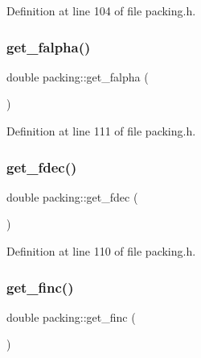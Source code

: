 Definition at line 104 of file packing.\+h.

\mbox{\label{classpacking_a0c8cad7afd9da1c30856b1201be15535}} 
\subsubsection{\texorpdfstring{get\+\_\+falpha()}{get\_falpha()}}
{\footnotesize\ttfamily double packing\+::get\+\_\+falpha (\begin{DoxyParamCaption}{ }\end{DoxyParamCaption})\hspace{0.3cm}{\ttfamily [inline]}}



Definition at line 111 of file packing.\+h.

\mbox{\label{classpacking_a2b4e47ab0671d9ee9892495df465be17}} 
\subsubsection{\texorpdfstring{get\+\_\+fdec()}{get\_fdec()}}
{\footnotesize\ttfamily double packing\+::get\+\_\+fdec (\begin{DoxyParamCaption}{ }\end{DoxyParamCaption})\hspace{0.3cm}{\ttfamily [inline]}}



Definition at line 110 of file packing.\+h.

\mbox{\label{classpacking_a58b555de4a9902399b3ab82dabfefd12}} 
\subsubsection{\texorpdfstring{get\+\_\+finc()}{get\_finc()}}
{\footnotesize\ttfamily double packing\+::get\+\_\+finc (\begin{DoxyParamCaption}{ }\end{DoxyParamCaption})\hspace{0.3cm}{\ttfamily [inline]}}



